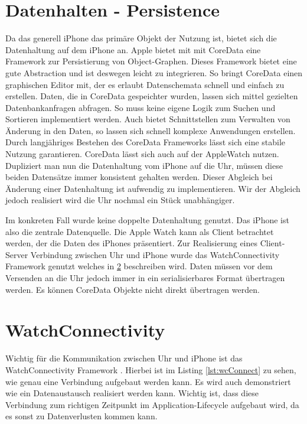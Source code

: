 \section{Datenhalten - Persistence}
Da das generell iPhone das primäre Objekt der Nutzung ist, bietet sich die Datenhaltung auf dem iPhone an. Apple bietet mit mit CoreData \cite{Apple:2015swiftOpen} eine Framework zur Persistierung von Object-Graphen. Dieses Framework bietet eine gute Abstraction und ist deswegen leicht zu integrieren. So bringt CoreData einen graphischen Editor mit, der es erlaubt Datenschemata schnell und einfach zu erstellen. Daten, die in CoreData gespeichter wurden, lassen sich mittel gezielten Datenbankanfragen abfragen. So muss keine eigene Logik zum Suchen und Sortieren implementiert werden. Auch bietet Schnittstellen zum Verwalten von Änderung in den Daten, so lassen sich schnell komplexe Anwendungen erstellen. Durch langjähriges Bestehen des CoreData Frameworks lässt sich eine stabile Nutzung garantieren.  CoreData lässt sich auch auf der AppleWatch nutzen. Dupliziert man nun die Datenhaltung vom iPhone auf die Uhr, müssen diese beiden Datensätze immer konsistent gehalten werden. Dieser Abgleich bei Änderung einer Datenhaltung ist aufwendig zu implementieren. Wir der Abgleich jedoch realisiert wird die Uhr nochmal ein Stück unabhängiger. 

Im konkreten Fall wurde keine doppelte Datenhaltung genutzt. Das iPhone ist also die zentrale Datenquelle. Die Apple Watch kann als Client betrachtet werden, der die Daten des iPhones präsentiert. Zur Realisierung eines Client-Server Verbindung zwischen Uhr und iPhone wurde das WatchConnectivity Framework genutzt welches in \ref{watchCon} beschreiben wird. Daten müssen vor dem Versenden an die Uhr jedoch immer in ein serialisierbares Format übertragen werden. Es können CoreData Objekte nicht direkt übertragen werden.


\section{WatchConnectivity}
\label{watchCon}
Wichtig für die Kommunikation zwischen Uhr und iPhone ist das WatchConnectivity Framework \cite{Apple:2015SharingDataToWatch}. Hierbei ist im Listing \ref{lst:wcConnect} zu sehen, wie genau eine Verbindung aufgebaut werden kann. Es wird auch demonstriert wie ein Datenaustausch realisiert werden kann. Wichtig ist, dass diese Verbindung zum richtigen Zeitpunkt im Application-Lifecycle aufgebaut wird, da es sonst zu Datenverlusten kommen kann.

